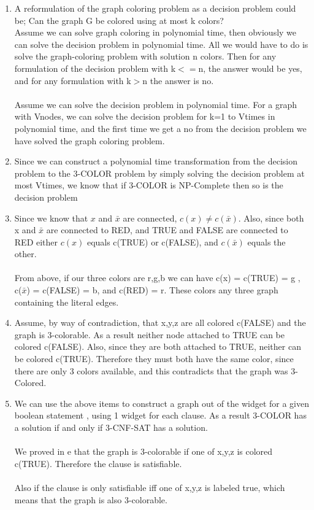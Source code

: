 \documentclass[11pt,fleqn]{article}
\begin{document}
\begin{enumerate}
\begin{enumerate}
\item A reformulation of the graph coloring problem as a decision problem could be; Can the graph G be colored using at most k colors? \\
Assume we can solve graph coloring in polynomial time, then obviously we can solve the decision problem in polynomial time. All we would have to do is solve the graph-coloring problem with solution n colors. Then for any formulation of the decision problem with k$<=$n, the answer would be yes, and for any formulation with k$>$n the answer is no. \\
\\
Assume we can solve the decision problem in polynomial time. For a graph with \textbar V\textbar nodes, we can solve the decision problem for k=1 to \textbar V\textbar times in polynomial time, and the first time we get a no from the decision problem we have solved the graph coloring problem. 

\item Since we can construct a polynomial time transformation from the decision problem to the 3-COLOR problem by simply solving the decision problem at most \textbar V\textbar times, we know that if 3-COLOR is NP-Complete then so is the decision problem

\item Since we know that $x$ and $\bar{x}$ are connected, $c(x) \neq c(\bar{x})$. Also, since both x and $\bar{x}$ are connected to RED,  and TRUE and FALSE are connected to RED either $c(x)$ equals c(TRUE) or c(FALSE), and $c(\bar{x})$ equals the other. \\
\\
From above, if our three colors are r,g,b we can have c(x) = c(TRUE) = g , c($\bar{x}$) = c(FALSE) = b, and c(RED) = r. These colors any three graph containing the literal edges. 

\item
Assume, by way of contradiction, that x,y,z are all colored c(FALSE) and the graph is 3-colorable. As a result neither node attached to TRUE can be colored c(FALSE). Also, since they are both attached to TRUE, neither can be colored c(TRUE). Therefore they must both have the same color, since there are only 3 colors available, and this contradicts that the graph was 3-Colored. 

\item
We can use the above items to construct a graph out of the widget for a given boolean statement , using 1 widget for each clause. As a result 3-COLOR has a solution if and only if 3-CNF-SAT has a solution. \\
\\
We proved in e that the graph is 3-colorable if one of x,y,z is colored c(TRUE). Therefore the clause is satisfiable. \\
\\
Also if the clause is only satisfiable iff one of x,y,z is labeled true, which means that the graph is also 3-colorable. 

\end{enumerate}

\end{enumerate}
\end{document}

